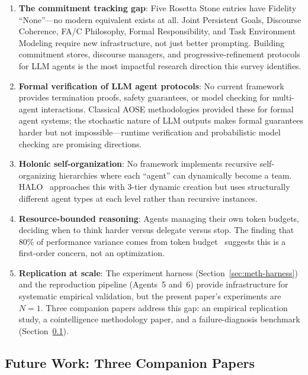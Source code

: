\documentclass{article}
\begin{document}
\begin{enumerate}[nosep]
  \item \textbf{The commitment tracking gap}: Five Rosetta Stone entries have Fidelity
    ``None''---no modern equivalent exists at all. Joint Persistent Goals, Discourse
    Coherence, FA/C Philosophy, Formal Responsibility, and Task Environment Modeling
    require new infrastructure, not just better prompting. Building commitment stores,
    discourse managers, and progressive-refinement protocols for LLM agents is the
    most impactful research direction this survey identifies.
  \item \textbf{Formal verification of LLM agent protocols}: No current framework
    provides termination proofs, safety guarantees, or model checking for multi-agent
    interactions. Classical AOSE methodologies provided these for formal agent
    systems; the stochastic nature of LLM outputs makes formal guarantees harder but
    not impossible---runtime verification and probabilistic model checking are
    promising directions.
  \item \textbf{Holonic self-organization}: No framework implements recursive
    self-organizing hierarchies where each ``agent'' can dynamically become a team.
    HALO~\citep{halo2025} approaches this with 3-tier dynamic creation but uses
    structurally different agent types at each level rather than recursive instances.
  \item \textbf{Resource-bounded reasoning}: Agents managing their own token budgets,
    deciding when to think harder versus delegate versus stop. The finding that 80\%
    of performance variance comes from token budget~\citep{anthropic2025building}
    suggests this is a first-order concern, not an optimization.
  \item \textbf{Replication at scale}: The experiment harness
    (Section~\ref{sec:meth-harness}) and the reproduction pipeline (Agents~5
    and~6) provide infrastructure for systematic empirical validation, but the
    present paper's experiments are $N{=}1$. Three companion papers address
    this gap: an empirical replication study, a cointelligence methodology paper,
    and a failure-diagnosis benchmark (Section~\ref{sec:future-work}).
\end{enumerate}


\subsection{Future Work: Three Companion Papers}
\label{sec:future-work}
\end{document}
